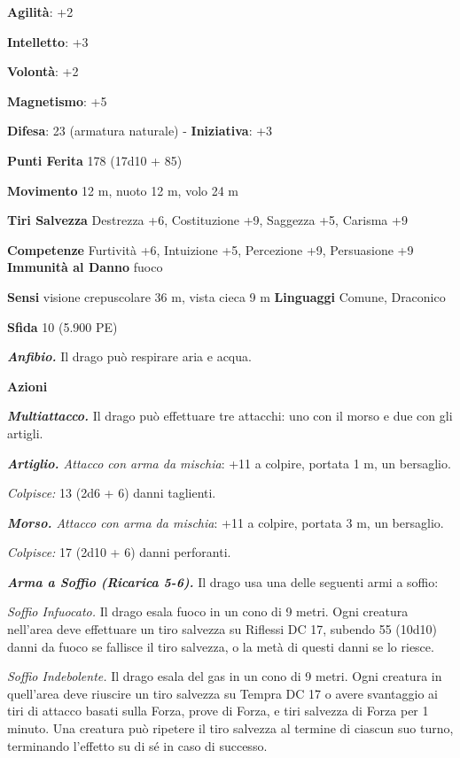 \begin{multicols}{2}
\textbf{Agilità}: +2

\textbf{Intelletto}: +3

\textbf{Volontà}: +2

\textbf{Magnetismo}: +5

\textbf{Difesa}: 23 (armatura naturale) - \textbf{Iniziativa}: +3

\textbf{Punti Ferita} 178 (17d10 + 85)

\textbf{Movimento} 12 m, nuoto 12 m, volo 24 m

\textbf{Tiri Salvezza} Destrezza +6, Costituzione +9, Saggezza +5,
Carisma +9

\textbf{Competenze} Furtività +6, Intuizione +5, Percezione +9, Persuasione
+9 \textbf{Immunità al Danno} fuoco

\textbf{Sensi} visione crepuscolare 36 m, vista cieca 9 m
\textbf{Linguaggi} Comune, Draconico

\textbf{Sfida} 10 (5.900 PE)\smallskip

\emph{\textbf{Anfibio.}} Il drago può respirare aria e acqua.

\smallskip\textbf{Azioni}

\emph{\textbf{Multiattacco.}} Il drago può effettuare tre attacchi: uno
con il morso e due con gli artigli.

\emph{\textbf{Artiglio.} Attacco con arma da mischia}: +11 a colpire,
portata 1 m, un bersaglio.

\emph{Colpisce:} 13 (2d6 + 6) danni taglienti.

\emph{\textbf{Morso.} Attacco con arma da mischia}: +11 a colpire,
portata 3 m, un bersaglio.

\emph{Colpisce:} 17 (2d10 + 6) danni perforanti.

\emph{\textbf{Arma a Soffio (Ricarica 5-6).}} Il drago usa una delle
seguenti armi a soffio:

\emph{Soffio Infuocato.} Il drago esala fuoco in un cono di 9 metri.
Ogni creatura nell'area deve effettuare un tiro salvezza su Riflessi DC
17, subendo 55 (10d10) danni da fuoco se fallisce il tiro salvezza, o la
metà di questi danni se lo riesce.

\emph{Soffio Indebolente.} Il drago esala del gas in un cono di 9 metri.
Ogni creatura in quell'area deve riuscire un tiro salvezza su Tempra DC
17 o avere svantaggio ai tiri di attacco basati sulla Forza, prove di
Forza, e tiri salvezza di Forza per 1 minuto. Una creatura può ripetere
il tiro salvezza al termine di ciascun suo turno, terminando l'effetto
su di sé in caso di successo.


\end{multicols}
